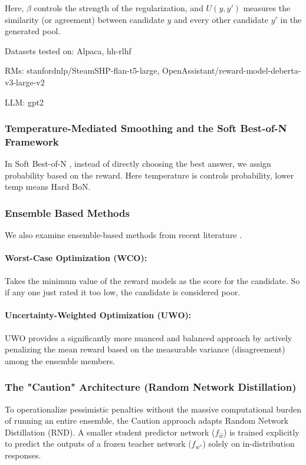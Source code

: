 \documentclass[a4paper,11pt]{article}
\begin{document}
Here, $\beta$ controls the strength of the regularization, and $U(y, y')$ measures the similarity (or agreement) between candidate $y$ and every other candidate $y'$ in the generated pool.

Datasets tested on: Alpaca, hh-rlhf

RMs: stanfordnlp/SteamSHP-flan-t5-large, OpenAssistant/reward-model-deberta-v3-large-v2

LLM: gpt2

\subsubsection{Temperature-Mediated Smoothing and the Soft Best-of-N Framework}
\label{sec:soft_bon}
In Soft Best-of-N \cite{verdun2025soft}, instead of directly choosing the best answer, we assign probability based on the reward. Here temperature is controls probability, lower temp means Hard BoN.

\subsubsection{Ensemble Based Methods}
\label{sec:ensemble}
We also examine ensemble-based methods from recent literature \cite{coste2023reward}.
\paragraph{Worst-Case Optimization (WCO):}Takes the minimum value of the reward models as the score for the candidate. So if any one just rated it too low, the candidate is considered poor.

\paragraph{Uncertainty-Weighted Optimization (UWO):}UWO provides a significantly more nuanced and balanced approach by actively penalizing the mean reward based on the measurable variance (disagreement) among the ensemble members.

\subsubsection{The "Caution" Architecture (Random Network Distillation)}
To operationalize pessimistic penalties without the massive computational burden of running an entire ensemble, the Caution approach \cite{yu2026curiosity} adapts Random Network Distillation (RND). A smaller student predictor network ($f_{\hat{w}}$) is trained explicitly to predict the outputs of a frozen teacher network ($f_{w^*}$) solely on in-distribution responses. 
\end{document}
